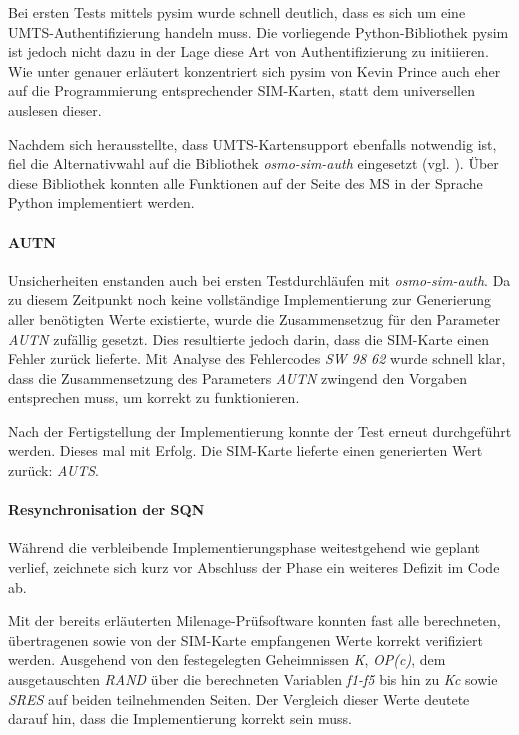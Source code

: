 		Bei ersten Tests mittels pysim wurde schnell deutlich, dass es
		sich um eine UMTS-Authentifizierung handeln muss. Die vorliegende
		Python-Bibliothek pysim ist jedoch nicht dazu in der Lage diese
		Art von Authentifizierung zu initiieren. Wie unter 
		genauer erläutert konzentriert sich pysim von Kevin Prince auch
		eher auf die Programmierung entsprechender SIM-Karten, statt
		dem universellen auslesen dieser.

		Nachdem sich herausstellte, dass \ac{UMTS}-Kartensupport ebenfalls 
		notwendig ist, fiel die Alternativwahl
		auf die Bibliothek \textit{osmo-sim-auth} eingesetzt
		(vgl. ). Über diese Bibliothek konnten
		alle Funktionen auf der Seite des \ac{MS} in der Sprache Python
		implementiert werden.

		\paragraph{AUTN} Unsicherheiten enstanden auch bei ersten Testdurchläufen
		mit \textit{osmo-sim-auth}. Da zu diesem Zeitpunkt noch keine 
		vollständige Implementierung zur Generierung aller benötigten
		Werte existierte, wurde die Zusammensetzug für den
		Parameter \textit{AUTN} zufällig gesetzt. Dies resultierte jedoch
		darin, dass die SIM-Karte einen Fehler zurück lieferte. Mit
		Analyse des Fehlercodes \textit{SW 98 62} wurde schnell klar,
		dass die Zusammensetzung des Parameters \textit{AUTN} zwingend
		den Vorgaben entsprechen muss, um korrekt zu funktionieren.

		Nach der Fertigstellung der Implementierung konnte der Test erneut
		durchgeführt werden. Dieses mal mit Erfolg. Die SIM-Karte lieferte
		einen generierten Wert zurück: \textit{AUTS}.

		\paragraph{Resynchronisation der SQN} Während die verbleibende
		Implementierungsphase weitestgehend wie geplant verlief, zeichnete
		sich kurz vor Abschluss der Phase ein weiteres Defizit im Code ab.

		Mit der bereits erläuterten Milenage-Prüfsoftware konnten fast
		alle berechneten, übertragenen sowie von der SIM-Karte empfangenen
		Werte korrekt verifiziert werden. Ausgehend von den festegelegten
		Geheimnissen \textit{K}, \textit{OP(c)}, dem ausgetauschten \textit{RAND}
		über die berechneten Variablen \textit{f1-f5} bis hin zu \textit{Kc} sowie
		\textit{SRES} auf beiden teilnehmenden Seiten.
		Der Vergleich dieser Werte deutete darauf hin, dass die Implementierung
		korrekt sein muss.

